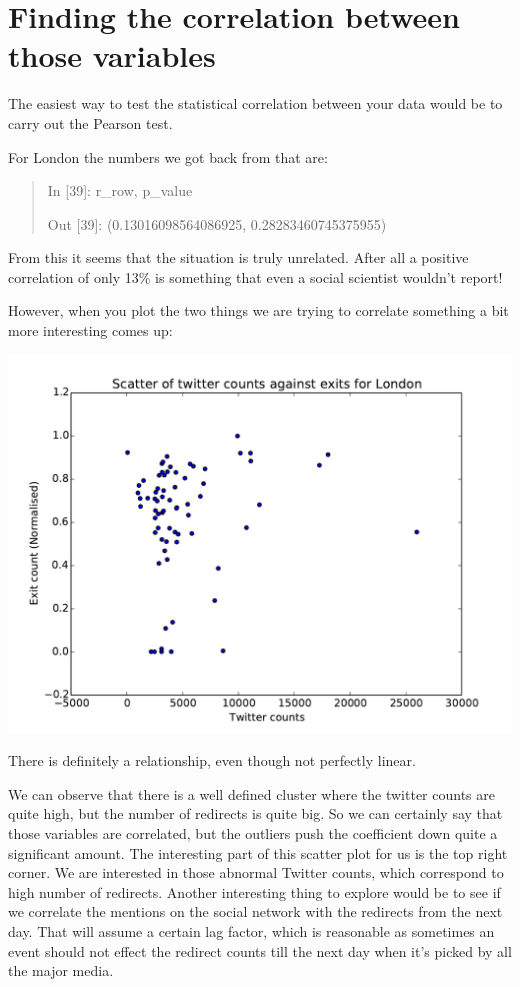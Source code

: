 \documentclass[minf,frontabs,twoside,singlespacing,parskip]{infthesis}
\begin{document}
\section{Finding the correlation between those variables}

The easiest way to test the statistical correlation between your data would be to carry out the Pearson test.

For London the numbers we got back from that are:
\begin{quotation}
In [39]: r\_row, p\_value

Out [39]: (0.13016098564086925, 0.28283460745375955)
\end{quotation}

From this it seems that the situation is truly unrelated. After all a positive correlation of only 13\% is something that even a social scientist wouldn't report!

However, when you plot the two things we are trying to correlate something a bit more interesting comes up:

\includegraphics[width=\textwidth]{scatterv1}

There is definitely a relationship, even though not perfectly linear.

We can observe that there is a well defined cluster where the twitter counts are quite high, but the number of redirects is quite big. So we can certainly say that those variables are correlated, but the outliers push the coefficient down quite a significant amount. The interesting part of this scatter plot for us is the top right corner. We are interested in those abnormal Twitter counts, which correspond to high number of redirects. Another interesting thing to explore would be to see if we correlate the mentions on the social network with the redirects from the next day. That will assume a certain lag factor, which is reasonable as sometimes an event should not effect the redirect counts till the next day when it's picked by all the major media.
\end{document}
